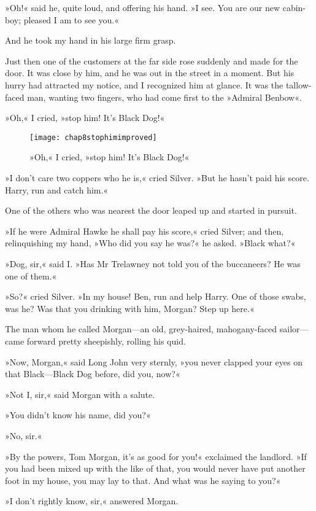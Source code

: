 »Oh!« said he, quite loud, and offering his hand. »I see. You are our new cabin-boy; pleased I am to see you.«

And he took my hand in his large firm grasp.

Just then one of the customers at the far side rose suddenly and made for the door. It was close by him, and he was out in the street in a moment. But his hurry had attracted my notice, and I recognized him at glance. It was the tallow-faced man, wanting two fingers, who had come first to the »Admiral Benbow«.

»Oh,« I cried, »stop him! It's Black Dog!«

\begin{sidewaysfigure}
\texttt{[image: chap8stophimimproved]}%
\caption{»Oh,« I cried, »stop him! It's Black Dog!«}
\end{sidewaysfigure}

»I don't care two coppers who he is,« cried Silver. »But he hasn't paid his score. Harry, run and catch him.«

One of the others who was nearest the door leaped up and started in pursuit.

»If he were Admiral Hawke he shall pay his score,« cried Silver; and then, relinquishing my hand, »Who did you say he was?« he asked. »Black what?«

»Dog, sir,« said I. »Has Mr Trelawney not told you of the buccaneers? He was one of them.«

»So?« cried Silver. »In my house! Ben, run and help Harry. One of those swabs, was he? Was that you drinking with him, Morgan? Step up here.«

The man whom he called Morgan—an old, grey-haired, mahogany-faced sailor—came forward pretty sheepishly, rolling his quid.

»Now, Morgan,« said Long John very sternly, »you never clapped your eyes on that Black—Black Dog before, did you, now?«

»Not I, sir,« said Morgan with a salute.

»You didn't know his name, did you?«

»No, sir.«

»By the powers, Tom Morgan, it's as good for you!« exclaimed the landlord. »If you had been mixed up with the like of that, you would never have put another foot in my house, you may lay to that. And what was he saying to you?«

»I don't rightly know, sir,« answered Morgan.

